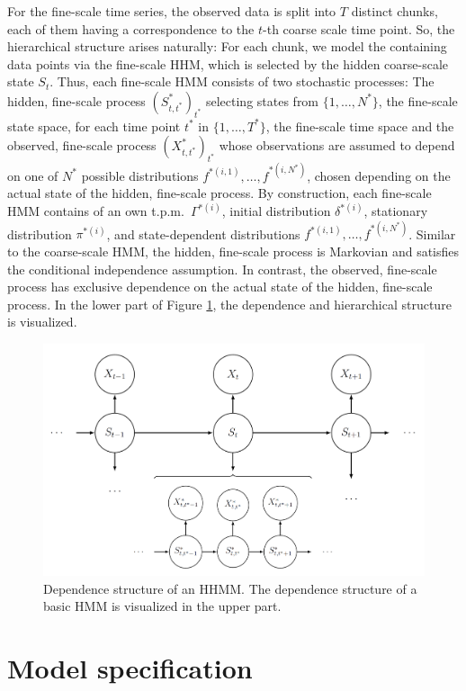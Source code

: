 \documentclass[article]{jss}
\begin{document}
For the fine-scale time series, the observed data is split into $T$ distinct chunks, each of them having a correspondence to the $t$-th coarse scale time point. So, the hierarchical structure arises naturally: For each chunk, we model the containing data points via the fine-scale HHM, which is selected by the hidden coarse-scale state $S_t$. Thus, each fine-scale HMM consists of two stochastic processes: The hidden, fine-scale process $(S^*_{t,t^*})_{t^*}$ selecting states from $\{1,\dots,N^*\}$, the fine-scale state space, for each time point $t^*$ in $\{1,\dots,T^*\}$, the fine-scale time space and the observed, fine-scale process $(X^*_{t,t^*})_{t^*}$ whose observations are assumed to depend on one of $N^*$ possible distributions $f^{*(i,1)},\dots,f^{*(i,N^*)}$, chosen depending on the actual state of the hidden, fine-scale process. By construction, each fine-scale HMM contains of an own t.p.m.\ $\Gamma^{*(i)}$, initial distribution $\delta^{*(i)}$, stationary distribution $\pi^{*(i)}$, and state-dependent distributions $f^{*(i,1)},\dots,f^{*(i,N^*)}$. Similar to the coarse-scale HMM, the hidden, fine-scale process is Markovian and satisfies the conditional independence assumption. In contrast, the observed, fine-scale process has exclusive dependence on the actual state of the hidden, fine-scale process. In the lower part of Figure \ref{fig:hhmm}, the dependence and hierarchical structure is visualized.

\begin{figure}
  \centering
  \includegraphics{hhmm.png}
  \caption{Dependence structure of an HHMM. The dependence structure of a basic HMM is visualized in the upper part.}
  \label{fig:hhmm}
\end{figure}

\section{Model specification} \label{sec:model_specification} %
\end{document}
